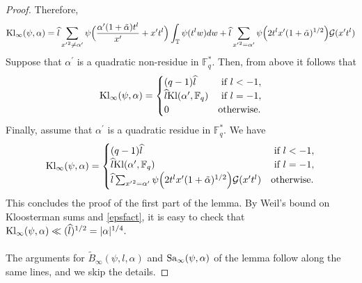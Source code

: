 \documentclass[10pt]{amsart}
\theoremstyle{plain}
\theoremstyle{plain}
\theoremstyle{remark}
\theoremstyle{definition}
\renewcommand{\hat}{\widehat}
\newcommand{\hl}{\widehat l}
\newcommand{\Kl}{\textup{Kl}}
\newcommand{\Sa}{\textup{Sa}}
\newcommand{\FF}{\mathbb{F}}
\newcommand{\TT}{\mathbb{T}}
\newcommand{\cG}{\mathcal{G}}
\begin{document}
\begin{proof}
Therefore, 
\[
\Kl_{\infty}(\psi,\alpha)=\hl \sum_{{x^{\prime}}^2\neq \alpha^{\prime}}  \psi\Big(\frac{\alpha^{\prime} (1+\tilde{\alpha})t^l}{x^{\prime}}+x^{\prime}t^{l} \Big)  \int_{\TT} \psi( t^{l}w)dw+\hl\sum_{{x^{\prime}}^2= \alpha^{\prime}}  \psi\Big(2t^{l}x^{\prime}(1+\tilde{\alpha})^{1/2} \Big) \cG(x^{\prime}t^l) \]
Suppose that $\alpha^{\prime}$ is a quadratic non-residue in $\FF_q^*.$ Then, from above it follows that
 \[
\Kl_{\infty}(\psi,\alpha)=\begin{cases} 
(q-1)\hl &\text{ if } l<-1,
\\
\hl \Kl(\alpha^{\prime},\FF_q) &\text{ if } l=-1,
\\
0   &\text{otherwise.} \end{cases}
\]
Finally, assume that $\alpha^{\prime}$ is a quadratic residue in $\FF_q^*.$ We have 
 \[
\Kl_{\infty}(\psi,\alpha)=\begin{cases} 
(q-1)\hl &\text{ if } l<-1,
\\
\hl \Kl(\alpha^{\prime},\FF_q) &\text{ if } l=-1,
\\
\hl\sum_{{x^{\prime}}^2= \alpha^{\prime}}  \psi\Big(2t^{l}x^{\prime}(1+\tilde{\alpha})^{1/2} \Big) \cG(x^{\prime}t^l)   &\text{otherwise.} \end{cases}
\]
This concludes the proof of the first part of the lemma. By Weil's bound on  Kloosterman sums and \eqref{epsfact}, it is easy to check that $\Kl_{\infty}(\psi,\alpha) \ll (\hat{l}) ^{1/2} =|\alpha|^{1/4}.$ 
\\
\\
 The arguments for $\widetilde{B}_{\infty}(\psi,l,\alpha)$ and $\Sa_{\infty}(\psi,\alpha)$ of the lemma follow along the same lines, and we skip the details.  
\end{proof}
\end{document}

